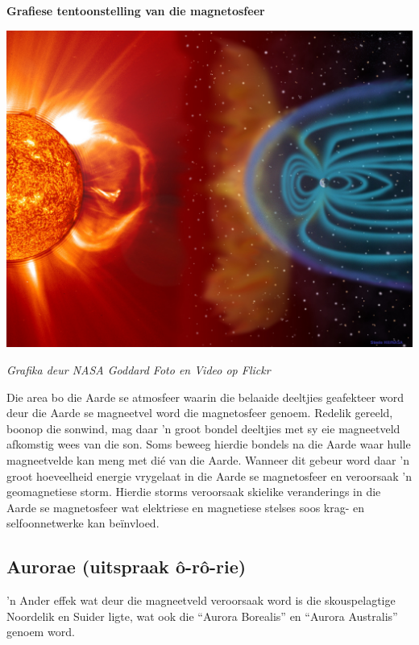 \label{m37830*fs-id1166236522828}
\begin{minipage}{.5\textwidth}
 \begin{center}
  \textbf{Grafiese tentoonstelling van die magnetosfeer}\par
  \includegraphics[width=.8\textwidth]{photos/magnetosphere.jpg}\par
  \textit{Grafika deur NASA Goddard Foto en Video op Flickr}
 \end{center}
\end{minipage}
\begin{minipage}{.5\textwidth}

Die area bo die Aarde se atmosfeer waarin die belaaide deeltjies geafekteer word deur die Aarde se magneetvel word die magnetosfeer genoem. Redelik gereeld, boonop die sonwind, mag daar 'n groot bondel deeltjies met sy eie magneetveld afkomstig wees van die son. Soms beweeg hierdie bondels na die Aarde waar hulle magneetvelde kan meng met di\'e van die Aarde. Wanneer dit gebeur word daar 'n groot hoeveelheid energie vrygelaat in die Aarde se magnetosfeer en veroorsaak 'n geomagnetiese storm. Hierdie storms veroorsaak skielike veranderings in die Aarde se magnetosfeer wat elektriese en magnetiese stelses soos krag- en selfoonnetwerke kan be\"invloed.

\end{minipage}
\par 


\subsection{Aurorae (uitspraak \^o-r\^o-rie) }
\nopagebreak
\label{m37830*fs-id1166211416999}

'n Ander effek wat deur die magneetveld veroorsaak word is die skouspelagtige Noordelik en Suider ligte, wat ook die ``Aurora Borealis'' en ``Aurora Australis'' genoem word. \par

